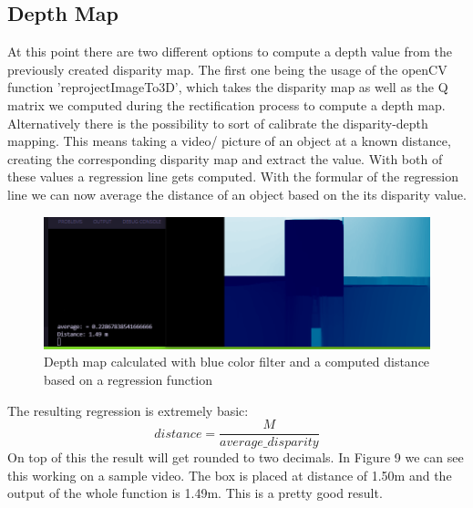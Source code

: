 \documentclass[journal,onecolumn]{IEEEtran}
\begin{document}
\subsection{Depth Map}
\noindent
At this point there are two different options to compute a depth value from the previously created disparity map. The first one being the usage of the openCV function 'reprojectImageTo3D', which takes the disparity map as well as the Q matrix we computed during the rectification process to compute a depth map.
Alternatively there is the possibility to sort of calibrate the disparity-depth mapping. This means taking a video/ picture of an object at a known distance, creating the corresponding disparity map and extract the value. With both of these values a regression line gets computed. With the formular of the regression line we can now average the distance of an object based on the its disparity value.
\begin{figure}[H]
	\centering
	\includegraphics[scale=0.5]{distanceCalcRegression.png}
	\caption{Depth map calculated with blue color filter and a computed distance based on a regression function}
\end{figure}
The resulting regression is extremely basic:
\begin{equation}
	distance = \frac{M}{average\_disparity}
\end{equation}
On top of this the result will get rounded to two decimals. In Figure 9 we can see this working on a sample video. The box is placed at distance of 1.50m and the output of the whole function is 1.49m. This is a pretty good result.
\end{document}
